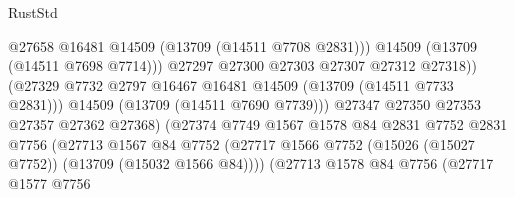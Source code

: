 \begin{lexlean}{RustStd}
\begin{coremodule}
                                                @27658
                                                @16481
                                                @14509
                                                (@13709 (@14511 @7708 @2831)))
                                              @14509
                                              (@13709 (@14511 @7698 @7714)))
                                            @27297
                                            @27300
                                            @27303
                                            @27307
                                            @27312
                                            @27318))
                                        (@27329
                                          @7732
                                          @2797
                                          @16467
                                          @16481
                                          @14509
                                          (@13709 (@14511 @7733 @2831)))
                                        @14509
                                        (@13709 (@14511 @7690 @7739)))
                                      @27347
                                      @27350
                                      @27353
                                      @27357
                                      @27362
                                      @27368)
                                    (@27374
                                      @7749
                                      @1567
                                      @1578
                                      @84
                                      @2831
                                      @7752
                                      @2831
                                      @7756
                                      (@27713
                                        @1567
                                        @84
                                        @7752
                                        (@27717
                                          @1566
                                          @7752
                                          (@15026 (@15027 @7752))
                                          (@13709 (@15032 @1566 @84))))
                                      (@27713
                                        @1578
                                        @84
                                        @7756
                                        (@27717
                                          @1577
                                          @7756

\end{coremodule}
\end{lexlean}
